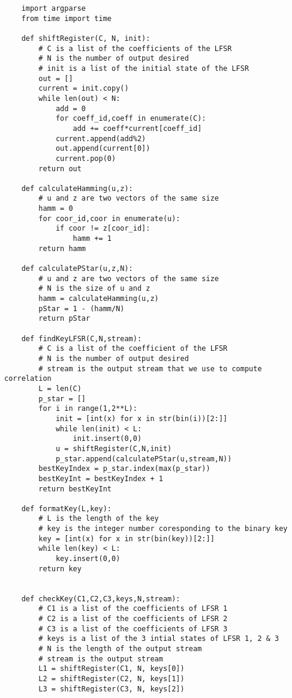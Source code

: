 \documentclass{article}
\begin{document}
\begin{verbatim}
    import argparse
    from time import time
    
    def shiftRegister(C, N, init):
        # C is a list of the coefficients of the LFSR
        # N is the number of output desired
        # init is a list of the initial state of the LFSR
        out = []
        current = init.copy()
        while len(out) < N:
            add = 0
            for coeff_id,coeff in enumerate(C):
                add += coeff*current[coeff_id]
            current.append(add%2)
            out.append(current[0])
            current.pop(0)
        return out
    
    def calculateHamming(u,z):
        # u and z are two vectors of the same size
        hamm = 0
        for coor_id,coor in enumerate(u):
            if coor != z[coor_id]:
                hamm += 1
        return hamm
    
    def calculatePStar(u,z,N):
        # u and z are two vectors of the same size
        # N is the size of u and z
        hamm = calculateHamming(u,z)
        pStar = 1 - (hamm/N)
        return pStar
    
    def findKeyLFSR(C,N,stream):
        # C is a list of the coefficient of the LFSR
        # N is the number of output desired
        # stream is the output stream that we use to compute correlation
        L = len(C)
        p_star = []
        for i in range(1,2**L):
            init = [int(x) for x in str(bin(i))[2:]]
            while len(init) < L:
                init.insert(0,0)
            u = shiftRegister(C,N,init)
            p_star.append(calculatePStar(u,stream,N))
        bestKeyIndex = p_star.index(max(p_star))
        bestKeyInt = bestKeyIndex + 1
        return bestKeyInt
    
    def formatKey(L,key):
        # L is the length of the key
        # key is the integer number coresponding to the binary key
        key = [int(x) for x in str(bin(key))[2:]]
        while len(key) < L:
            key.insert(0,0)
        return key
    
    
    def checkKey(C1,C2,C3,keys,N,stream):
        # C1 is a list of the coefficients of LFSR 1
        # C2 is a list of the coefficients of LFSR 2
        # C3 is a list of the coefficients of LFSR 3
        # keys is a list of the 3 intial states of LFSR 1, 2 & 3
        # N is the length of the output stream
        # stream is the output stream
        L1 = shiftRegister(C1, N, keys[0])
        L2 = shiftRegister(C2, N, keys[1])
        L3 = shiftRegister(C3, N, keys[2])
    

\end{verbatim}
\end{document}
